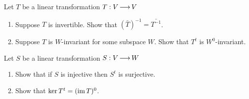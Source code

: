 \documentclass{amsart}
\begin{document}
	Let $T$ be a linear transformation $T: V \operatorname{\longrightarrow} V$
	\begin{enumerate}
		\item Suppose $T$ is invertible. Show that $(\bar T)^{-1} = \bar {T^{-1}} $.
		\item Suppose $T$ is $W$-invariant for some subspace $W$. Show that $T^t$ is $W^0$-invariant.
	\end{enumerate}

	Let $S$ be a linear transformation $S: V \operatorname{\longrightarrow} W$	
	
	\begin{enumerate}
		\item Show that if $S$ is injective then $S^t$ is surjective.
		\item Show that $\ker T^t = (\operatorname{im} T)^0$.
	\end{enumerate}
\end{document}
